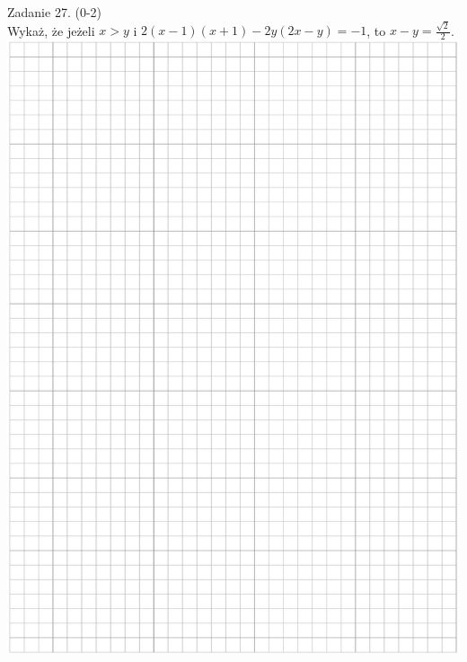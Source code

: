 \documentclass[10pt]{article}
\begin{document}
Zadanie 27. (0-2)\\
Wykaż, że jeżeli \(x>y\) i \(2(x-1)(x+1)-2 y(2 x-y)=-1\), to \(x-y=\frac{\sqrt{2}}{2}\).\\
\includegraphics[max width=\textwidth, center]{2024_11_21_99eb8e6624b497a5af43g-11}
\end{document}
